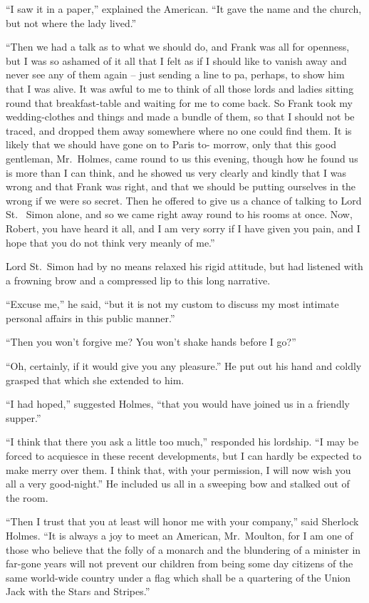 “I saw it in a paper,” explained the American. “It gave
the name and the church, but not where the lady lived.”

“Then we had a talk as to what we should do, and Frank
was all for openness, but I was so ashamed of it all that I felt
as if I should like to vanish away and never see any of them
again -- just sending a line to pa, perhaps, to show him that I
was alive. It was awful to me to think of all those lords and
ladies sitting round that breakfast-table and waiting for me to
come back. So Frank took my wedding-clothes and things
and made a bundle of them, so that I should not be traced,
and dropped them away somewhere where no one could find
them. It is likely that we should have gone on to Paris to-%
morrow, only that this good gentleman, Mr.~Holmes, came
round to us this evening, though how he found us is more
than I can think, and he showed us very clearly and kindly
that I was wrong and that Frank was right, and that we
should be putting ourselves in the wrong if we were so secret.
Then he offered to give us a chance of talking to Lord St.\ %
Simon alone, and so we came right away round to his rooms
at once. Now, Robert, you have heard it all, and I am very
sorry if I have given you pain, and I hope that you do not
think very meanly of me.”

Lord St.~Simon had by no means relaxed his rigid attitude,
but had listened with a frowning brow and a compressed lip
to this long narrative.

“Excuse me,” he said, “but it is not my custom to discuss
my most intimate personal affairs in this public manner.”

“Then you won’t forgive me? You won’t shake hands before
I go?”

“Oh, certainly, if it would give you any pleasure.” He put
out his hand and coldly grasped that which she extended to
him.

“I had hoped,” suggested Holmes, “that you would have
joined us in a friendly supper.”

“I think that there you ask a little too much,” responded
his lordship. “I may be forced to acquiesce in these recent
developments, but I can hardly be expected to make merry
over them. I think that, with your permission, I will now wish
you all a very good-night.” He included us all in a sweeping
bow and stalked out of the room.

“Then I trust that you at least will honor me with your
company,” said Sherlock Holmes. “It is always a joy to
meet an American, Mr.~Moulton, for I am one of those who
believe that the folly of a monarch and the blundering of a
minister in far-gone years will not prevent our children from
being some day citizens of the same world-wide country under
a flag which shall be a quartering of the Union Jack with the
Stars and Stripes.”

